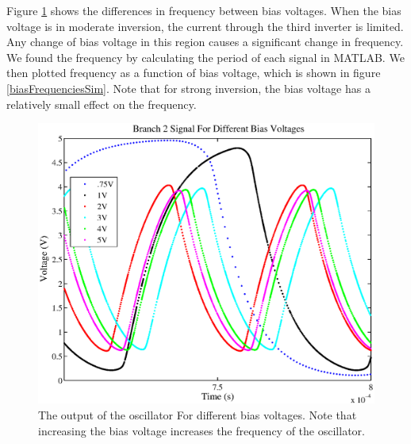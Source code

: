 \documentclass{article}
\begin{document}
Figure \ref{branch2DiffBiasSim} shows the differences in frequency between bias voltages. When the bias voltage is in moderate inversion, the current through the third inverter is limited. Any change of bias voltage in this region causes a significant change in frequency. We found the frequency by calculating the period of each signal in MATLAB. We then plotted frequency as a function of bias voltage, which is shown in figure \ref{biasFrequenciesSim}. Note that for strong inversion, the bias voltage has a relatively small effect on the frequency.

\begin{figure}[H]
\centering
\includegraphics[scale=.7]{branch2DiffBiasSim.eps}
\caption{The output of the oscillator For different bias voltages. Note that increasing the bias voltage increases the frequency of the oscillator.}
\label{branch2DiffBiasSim}
\end{figure}
\end{document}
